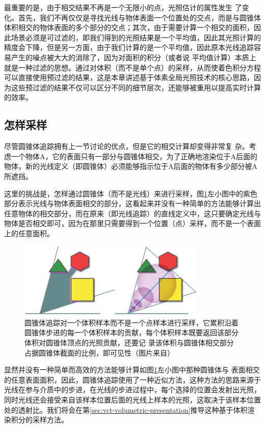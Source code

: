 最重要的是，由于相交结果不再是一个无限小的点，光照估计的属性发生 了变化。首先，我们不再仅仅是寻找光线与物体表面一个位置处的交点，而是与圆锥体体积相交的物体表面的多个部分的交点；其次，由于需要计算一个相交的面积，因此场景必须是可过滤的，即我们得到的光照结果是一个平均值，因此其光照计算的精度会下降，但是另一方面，由于我们计算的是一个平均值，因此原本光线追踪容易产生的噪点被大大的消除了，因为对面积的积分（或者说 平均值计算）本质上就是一种过滤的思想。通过对体积（而不是单个点）的采样，从而使着色积分方程可以直接使用预过滤的结果，这是本章讲述基于体素全局光照技术的核心思路，因为这些预过滤的结果不仅可以区分不同的细节层次，还能够被重用以提高实时计算的效率。



\subsection{怎样采样}
尽管圆锥体追踪拥有上一节讨论的优点，但是它的相交计算却变得非常复 杂。考虑一个物体A，它的表面只有一部分与圆锥体相交，为了正确地渲染位于A后面的物体，新的光线定义（即圆锥体）必须能够指示位于A后面的物体有多少部分被A所遮挡。

这里的挑战是，怎样通过圆锥体（而不是光线）来进行采样，图\ref{f:vct-2-2}左小图中的紫色部分表示光线与物体表面相交的部分，这看起来并没有一种简单的方法能够计算出任意物体的相交部分，而在原来（即光线追踪）的直线定义中，这只要确定光线与物体是否相交即可，因为在那里只需要得到一个位置（点）采样，而不是一个表面上的任意面积。

\begin{figure}
\begin{center}
	\includegraphics[width=0.8\textwidth]{figures/vct/vct-2-2}
	\end{center}
	\caption{圆锥体追踪对一个体积样本而不是一个点样本进行采样，它累积沿着圆锥体步进的每一个体积样本的贡献，每个体积样本既要返回该部分体积对圆锥体顶点的光照贡献，还要记 录该体积与圆锥体相交部分占据圆锥体截面的比例，即可见性（图片来自\cite{a:TheTechnologyofTheTomorrowChildren}）}
	\label{f:vct-2-2}
\end{figure}

显然并没有一种简单而高效的方法能够计算如图\ref{f:vct-2-2}左小图中那种圆锥体与 表面相交的任意表面面积，因此，圆锥体追踪使用了一种近似方法，这种方法的思路来源于光线在参与介质中的步进，在光线的步进过程中，每个选择的位置会发射出光照，同时光线还会接受来自该样本位置后面的光线上样本的光照，这取决于该样本位置处的透射比。我们将会在第\ref{sec:vct-volumetric-presentation}推导这种基于体积渲染积分的采样方法。

